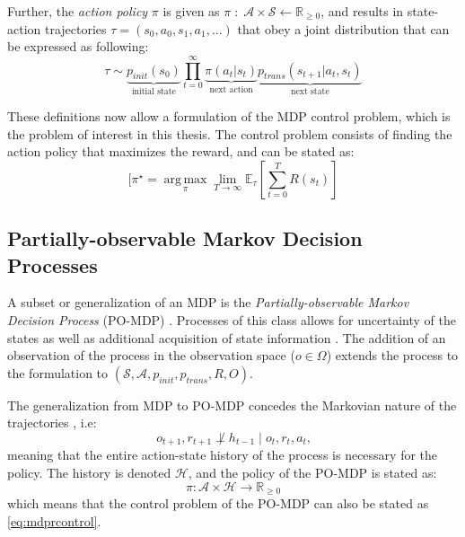 Further, the \textit{action policy} $\pi$ is given as $\pi \; : \; \mathcal{A}\times \mathcal{S}
\leftarrow \mathbb{R}_{\geq 0}$, and results in state-action trajectories $\tau = (s_0, a_0, s_1, a_1, ... )$ that obey a joint distribution that can be expressed as following: \cite{prouvost2020ecole}
\begin{equation}
    \tau \sim \underbrace{p_\textit{init}(s_0)}_{\text{initial state}}
\prod_{t=0}^\infty \underbrace{\pi(a_t | s_t)}_{\text{next action}}
\underbrace{p_\textit{trans}(s_{t+1} | a_t, s_t)}_{\text{next state}}
\end{equation}

These definitions now allow a formulation of the \gls{MDP} control problem, which is the problem of interest in this thesis. The control problem consists of finding the action policy that maximizes the reward, and can be stated as: \cite{prouvost2020ecole}
\begin{equation}\label{eq:mdprcontrol}
    [\pi^\star = \underset{\pi}{\operatorname{arg\,max}}
\lim_{T \to \infty} \mathbb{E}_\tau\left[\sum_{t=0}^{T} R(s_t)\right]
\end{equation}


\subsection{Partially-observable Markov Decision Processes}

A subset or generalization of an \gls{MDP} is the \textit{Partially-observable Markov Decision Process }(\gls{PO-MDP}) \cite{monahan1982state}. Processes of this class allows for uncertainty of the states as well as additional acquisition of state information \cite{monahan1982state}.
The addition of an observation of the process in the observation space ($o \in \Omega $) extends the process to the formulation to $ (\mathcal{S}, \mathcal{A}, p_{init}, p_{trans}, R, O)$. 

The generalization from \gls{MDP} to \gls{PO-MDP} concedes the Markovian nature of the trajectories \cite{prouvost2020ecole}, i.e:
\begin{equation}
    o_{t+1},r_{t+1} \not \perp   h_{t-1} \mid o_t,r_t,a_t
\text{,}
\end{equation}
meaning that the entire action-state history of the process is necessary for the policy. The history is denoted $\mathcal{H}$, and the policy of the \gls{PO-MDP} is stated as:
\begin{equation}
    \pi:\mathcal{A} \times \mathcal{H} \to \mathbb{R}_{\geq 0}
\end{equation}
which means that the control problem of the \gls{PO-MDP} can also be stated as \cref{eq:mdprcontrol}. 

